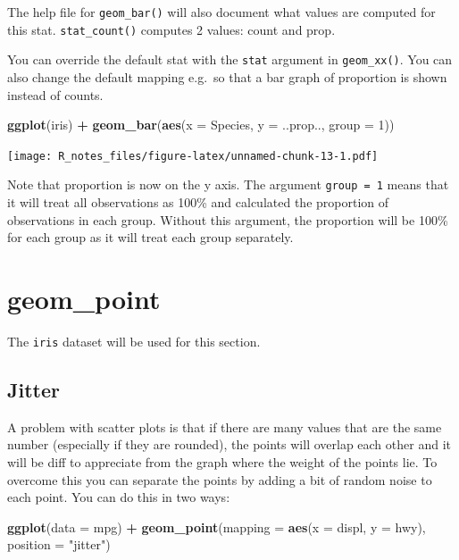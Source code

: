 \documentclass[]{book}
\newenvironment{Shaded}{\begin{snugshade}}{\end{snugshade}}
\newcommand{\KeywordTok}[1]{\textcolor[rgb]{0.13,0.29,0.53}{\textbf{#1}}}
\newcommand{\DataTypeTok}[1]{\textcolor[rgb]{0.13,0.29,0.53}{#1}}
\newcommand{\DecValTok}[1]{\textcolor[rgb]{0.00,0.00,0.81}{#1}}
\newcommand{\StringTok}[1]{\textcolor[rgb]{0.31,0.60,0.02}{#1}}
\newcommand{\OperatorTok}[1]{\textcolor[rgb]{0.81,0.36,0.00}{\textbf{#1}}}
\newcommand{\NormalTok}[1]{#1}
\begin{document}
The help file for \texttt{geom\_bar()} will also document what values
are computed for this stat. \texttt{stat\_count()} computes 2 values:
count and prop.

You can override the default stat with the \texttt{stat} argument in
\texttt{geom\_xx()}. You can also change the default mapping e.g.~so
that a bar graph of proportion is shown instead of counts.

\begin{Shaded}
\begin{Highlighting}[]
\KeywordTok{ggplot}\NormalTok{(iris) }\OperatorTok{+}\StringTok{ }
\StringTok{  }\KeywordTok{geom_bar}\NormalTok{(}\KeywordTok{aes}\NormalTok{(}\DataTypeTok{x =}\NormalTok{ Species, }\DataTypeTok{y =}\NormalTok{ ..prop.., }\DataTypeTok{group =} \DecValTok{1}\NormalTok{))}
\end{Highlighting}
\end{Shaded}

\texttt{[image: R\_notes\_files/figure-latex/unnamed-chunk-13-1.pdf]}

Note that proportion is now on the y axis. The argument
\texttt{group\ =\ 1} means that it will treat all observations as 100\%
and calculated the proportion of observations in each group. Without
this argument, the proportion will be 100\% for each group as it will
treat each group separately.

\section{geom\_point}\label{geom_point}

The \texttt{iris} dataset will be used for this section.

\subsection{Jitter}\label{jitter}

A problem with scatter plots is that if there are many values that are
the same number (especially if they are rounded), the points will
overlap each other and it will be diff to appreciate from the graph
where the weight of the points lie. To overcome this you can separate
the points by adding a bit of random noise to each point. You can do
this in two ways:

\begin{Shaded}
\begin{Highlighting}[]
\KeywordTok{ggplot}\NormalTok{(}\DataTypeTok{data =}\NormalTok{ mpg) }\OperatorTok{+}\StringTok{ }
\StringTok{  }\KeywordTok{geom_point}\NormalTok{(}\DataTypeTok{mapping =} \KeywordTok{aes}\NormalTok{(}\DataTypeTok{x =}\NormalTok{ displ, }\DataTypeTok{y =}\NormalTok{ hwy), }\DataTypeTok{position =} \StringTok{"jitter"}\NormalTok{)}
\end{Highlighting}
\end{Shaded}
\end{document}
